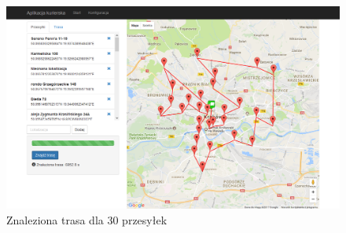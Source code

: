 \begin{figure}[H]
	\centering
	\includegraphics[width=1\linewidth]{screen/5_wiecej_punktow}
	\caption{Znaleziona trasa dla 30 przesyłek}
	\label{screen:5_wiecej_punktow}
\end{figure}

\clearpage